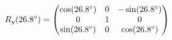 \documentclass[preview]{standalone}
\begin{document}
\begin{align*}
\special{dvisvgm:raw <g id='unique000'>}R_y(26.8^\circ) = \begin{pmatrix} \cos(26.8^\circ) & 0 & -\sin(26.8^\circ) \\ 0 & 1 & 0 \\ \sin(26.8^\circ) & 0 & \cos(26.8^\circ) \end{pmatrix}\special{dvisvgm:raw </g>}
\end{align*}
\end{document}
